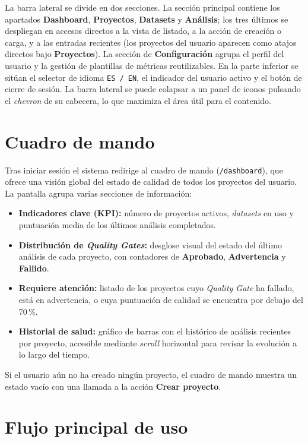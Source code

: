 La barra lateral se divide en dos secciones.  La sección principal
contiene los apartados \textbf{Dashboard}, \textbf{Proyectos},
\textbf{Datasets} y \textbf{Análisis}; los tres últimos se despliegan
en accesos directos a la vista de listado, a la acción de creación o
carga, y a las entradas recientes (los proyectos del usuario aparecen
como atajos directos bajo \textbf{Proyectos}).  La sección de
\textbf{Configuración} agrupa el perfil del usuario y la gestión de
plantillas de métricas reutilizables.  En la parte inferior se sitúan
el selector de idioma \texttt{ES~/~EN}, el indicador del usuario
activo y el botón de cierre de sesión.  La barra lateral se puede
colapsar a un panel de iconos pulsando el \emph{chevron} de su
cabecera, lo que maximiza el área útil para el contenido.

\section{Cuadro de mando}

Tras iniciar sesión el sistema redirige al cuadro de mando
(\texttt{/dashboard}), que ofrece una visión global del estado de
calidad de todos los proyectos del usuario.  La pantalla agrupa
varias secciones de información:

\begin{itemize}
  \item \textbf{Indicadores clave (KPI):} número de proyectos
    activos, \emph{datasets} en uso y puntuación media de los
    últimos análisis completados.
  \item \textbf{Distribución de \emph{Quality Gates}:} desglose
    visual del estado del último análisis de cada proyecto, con
    contadores de \textbf{Aprobado}, \textbf{Advertencia} y
    \textbf{Fallido}.
  \item \textbf{Requiere atención:} listado de los proyectos cuyo
    \emph{Quality Gate} ha fallado, está en advertencia, o cuya
    puntuación de calidad se encuentra por debajo del 70\,\%.
  \item \textbf{Historial de salud:} gráfico de barras con el
    histórico de análisis recientes por proyecto, accesible
    mediante \emph{scroll} horizontal para revisar la evolución a
    lo largo del tiempo.
\end{itemize}

Si el usuario aún no ha creado ningún proyecto, el cuadro de mando
muestra un estado vacío con una llamada a la acción \textbf{Crear
proyecto}.

\section{Flujo principal de uso}

